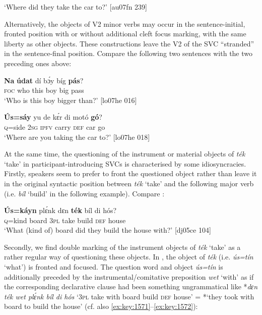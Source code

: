 \glt ‘Where did they take the car to?’ [au07fn 239]
\z

Alternatively, the objects of V2 minor verbs may occur in the sentence-initial, fronted position with or without additional cleft focus marking, with the same liberty as other objects. These constructions leave the V2 of the SVC “stranded” in the sentence-final position. Compare the following two sentences with the two preceding ones above: 


\ea%
    \label{ex:key:608}
    \gll \textbf{Na}  \textbf{údat}  dí  bɔ́y  bíg  \textbf{pás}?\\
\textsc{foc}  who    this  boy  big  pass\\

\glt ‘Who is this boy bigger than?’ [lo07he 016]
\z


\ea%
    \label{ex:key:609}
    \gll \textbf{\'{U}s=sáy}  yu  de  kɛ́r    di  motó  \textbf{gó}?\\
{\textsc{q}=side}  \textsc{2sg}  \textsc{ipfv}  carry  \textsc{def}  car    go\\

\glt ‘Where are you taking the car to?’ [lo07he 018]
\z

At the same time, the questioning of the instrument or material objects of \textit{ték} ‘take’ in participant-introducing SVCs is characterised by some idiosyncracies. Firstly, speakers seem to prefer to front the questioned object rather than leave it in the original syntactic position between \textit{ték} ‘take’ and the following major verb (i.e. \textit{bíl} ‘build’ in the following example). Compare :


\ea%
    \label{ex:key:610}
    \gll \textbf{\'{U}s=káyn}  plɛ́nk  dɛn  \textbf{ték}    bíl    di  hós?\\
\textsc{q}=kind  board  \textsc{3pl}  take    build  \textsc{def}  house\\

\glt ‘What (kind of) board did they build the house with?’ [dj05ce 104]
\z

Secondly, we find double marking of the instrument objects of \textit{ték} ‘take’ as a rather regular way of questioning these objects. In , the object of \textit{ték} (i.e. \textit{ús=tín} ‘what’) is fronted and focused. The question word and object \textit{ús=tín} is additionally preceded by the instrumental/comitative preposition \textit{wet} ‘with’ as if the corresponding declarative clause had been something ungrammatical like *\textit{dɛn ték wet plɛ́nk bíl di hós} ‘\textsc{3pl} take with board build \textsc{def} house’ = *‘they took with board to build the house’ (cf. also \ref{ex:key:1571}–\ref{ex:key:1572}): 


